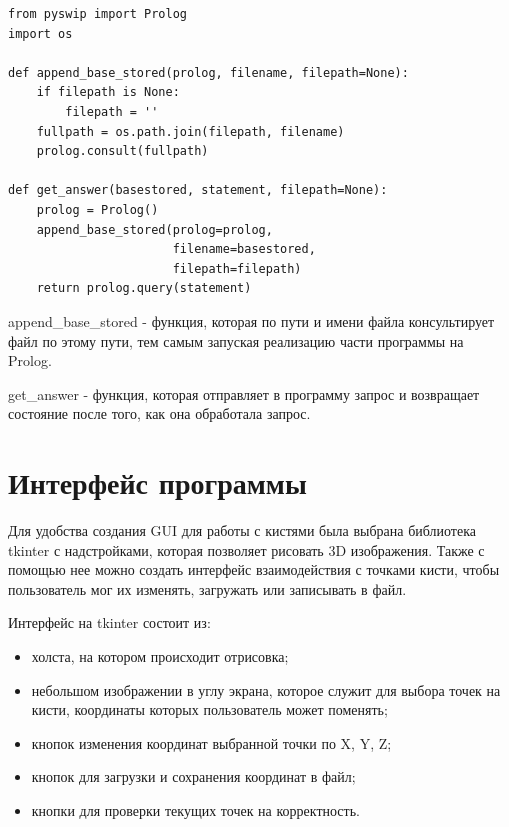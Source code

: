 \begin{lstlisting}[caption=Взаимодействие python и Prolog, label=rules:PythonProlog]
from pyswip import Prolog
import os

def append_base_stored(prolog, filename, filepath=None):
    if filepath is None:
        filepath = ''    
    fullpath = os.path.join(filepath, filename)
    prolog.consult(fullpath)
    
def get_answer(basestored, statement, filepath=None):
    prolog = Prolog()
    append_base_stored(prolog=prolog, 
                       filename=basestored,
                       filepath=filepath)
    return prolog.query(statement)

\end{lstlisting}

\hspace{0.6cm} append\_base\_stored - функция, которая по пути и имени файла консультирует файл по этому пути, тем самым запуская реализацию части программы на Prolog.

\hspace{0.6cm} get\_answer - функция, которая отправляет в программу запрос и возвращает состояние после того, как она обработала запрос.

\section{Интерфейс программы}
\hspace{0.6cm} Для удобства создания GUI для работы с кистями была выбрана библиотека tkinter с надстройками, которая позволяет рисовать 3D изображения. Также с помощью нее можно создать интерфейс взаимодействия с точками кисти, чтобы пользователь мог их изменять, загружать или записывать в файл.

\hspace{0.6cm} Интерфейс на tkinter состоит из:
\begin{itemize}
	\item холста, на котором происходит отрисовка;
	\item небольшом изображении в углу экрана, которое служит для выбора точек на кисти, координаты которых пользователь может поменять;
	\item кнопок изменения координат выбранной точки по X, Y, Z;
	\item кнопок для загрузки и сохранения координат в файл;
	\item кнопки для проверки текущих точек на корректность.
\end{itemize}

